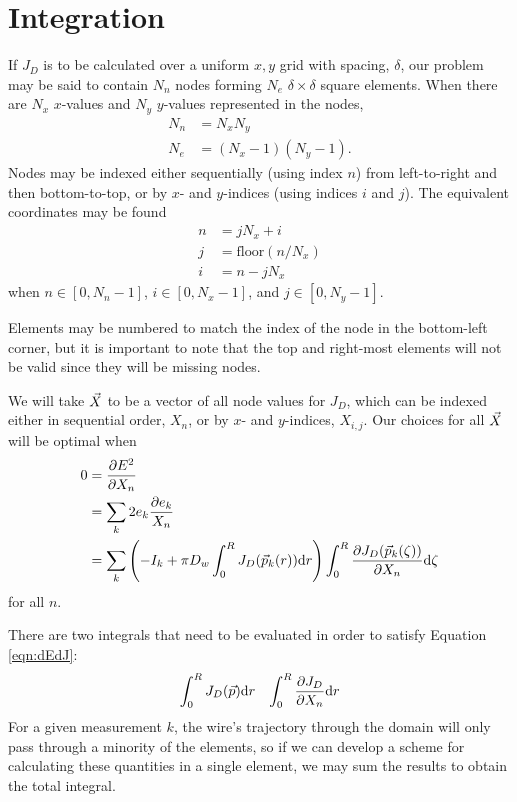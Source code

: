 \section{Integration}\label{sec:integral}

If $J_D$ is to be calculated over a uniform $x,y$ grid with spacing, $\delta$, our problem may be said to contain $N_n$ nodes forming $N_e$ $\delta\times \delta$ square elements.  When there are $N_x$ $x$-values and $N_y$ $y$-values represented in the nodes,
\begin{align}
N_n &= N_x N_y\\
N_e &= (N_x -1)(N_y -1).
\end{align}
Nodes may be indexed either sequentially (using index $n$) from left-to-right and then bottom-to-top, or by $x$- and $y$-indices (using indices $i$ and $j$).  The equivalent coordinates may be found
\begin{align}
n &= jN_x + i\\
j &= \mathrm{floor}(n/N_x)\\
i &= n - jN_x
\end{align}
when $n \in [0, N_n-1]$, $i \in [0, N_x-1]$, and $j \in [0, N_y-1]$.

Elements may be numbered to match the index of the node in the bottom-left corner, but it is important to note that the top and right-most elements will not be valid since they will be missing nodes.

We will take $\vec{X}$ to be a vector of all node values for $J_D$, which can be indexed either in sequential order, $X_n$, or by $x$- and $y$-indices, $X_{i,j}$.  Our choices for all $\vec{X}$ will be optimal when
\begin{align}
0 &= \frac{\partial E^2}{\partial X_n} \nonumber\\
& = \sum_k 2 e_k\frac{\partial e_k}{X_n} \nonumber\\
&= \sum_k \left(-I_k + \pi D_w \int_0^R J_D(\vec{p}_k(r)) \mathrm{d}r \right)\int_0^R \frac{\partial J_D(\vec{p}_k(\zeta))}{\partial X_n}\mathrm{d}\zeta\label{eqn:dEdJ}
\end{align}
for all $n$.

There are two integrals that need to be evaluated in order to satisfy Equation \ref{eqn:dEdJ}:
\begin{align}
\int_0^R J_D(\vec{p}) \mathrm{d}r & & \int_0^R \frac{\partial J_D}{\partial X_n} \mathrm{d}r\nonumber
\end{align}
For a given measurement $k$, the wire's trajectory through the domain will only pass through a minority of the elements, so if we can develop a scheme for calculating these quantities in a single element, we may sum the results to obtain the total integral.

